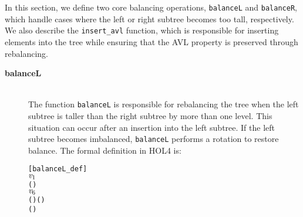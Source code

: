 \documentclass[12pt]{article}
\begin{document}
In this section, we define two core balancing operations, \texttt{balanceL} and \texttt{balanceR}, which handle cases where the left or right subtree becomes too tall, respectively. We also describe the \texttt{insert\_avl} function, which is responsible for inserting elements into the tree while ensuring that the AVL property is preserved through rebalancing.

\begin{description}

  \item[\textbf{balanceL}] \\
  The function \texttt{balanceL} is responsible for rebalancing the tree when the left subtree is taller than the right subtree by more than one level. This situation can occur after an insertion into the left subtree. If the left subtree becomes imbalanced, \texttt{balanceL} performs a rotation to restore balance. The formal definition in HOL4 is:

\begin{alltt}
[balanceL_def]
     \HOLTokenDefEquality{}
     \HOLSymConst{=}   \HOLSymConst{\ensuremath{+}}  
      
       \HOLTokenImp{}     
    \HOLTokenBar{}  \ensuremath{\HOLBoundVar{v}\sb{\mathrm{1}}}     \HOLTokenImp{}
         \HOLSymConst{\HOLTokenLt{}}   
          
           \HOLTokenImp{}     (    )
        \HOLTokenBar{}  \ensuremath{\HOLBoundVar{v}\sb{\mathrm{6}}}     \HOLTokenImp{}
             (    ) (    )
           (    )
       
\end{alltt}
  

\end{description}
\end{document}
